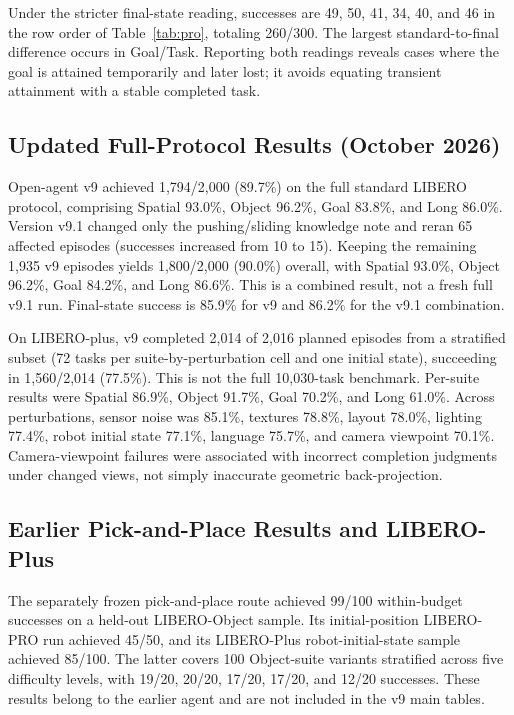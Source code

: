 Under the stricter final-state reading, successes are 49, 50, 41, 34, 40, and 46 in the row order of Table~\ref{tab:pro}, totaling 260/300. The largest standard-to-final difference occurs in Goal/Task. Reporting both readings reveals cases where the goal is attained temporarily and later lost; it avoids equating transient attainment with a stable completed task.

\subsection{Updated Full-Protocol Results (October 2026)}

Open-agent v9 achieved 1,794/2,000 (89.7\%) on the full standard LIBERO protocol, comprising Spatial 93.0\%, Object 96.2\%, Goal 83.8\%, and Long 86.0\%. Version v9.1 changed only the pushing/sliding knowledge note and reran 65 affected episodes (successes increased from 10 to 15). Keeping the remaining 1,935 v9 episodes yields 1,800/2,000 (90.0\%) overall, with Spatial 93.0\%, Object 96.2\%, Goal 84.2\%, and Long 86.6\%. This is a combined result, not a fresh full v9.1 run. Final-state success is 85.9\% for v9 and 86.2\% for the v9.1 combination.

On LIBERO-plus, v9 completed 2,014 of 2,016 planned episodes from a stratified subset (72 tasks per suite-by-perturbation cell and one initial state), succeeding in 1,560/2,014 (77.5\%). This is not the full 10,030-task benchmark. Per-suite results were Spatial 86.9\%, Object 91.7\%, Goal 70.2\%, and Long 61.0\%. Across perturbations, sensor noise was 85.1\%, textures 78.8\%, layout 78.0\%, lighting 77.4\%, robot initial state 77.1\%, language 75.7\%, and camera viewpoint 70.1\%. Camera-viewpoint failures were associated with incorrect completion judgments under changed views, not simply inaccurate geometric back-projection.

\subsection{Earlier Pick-and-Place Results and LIBERO-Plus}
The separately frozen pick-and-place route achieved 99/100 within-budget successes on a held-out LIBERO-Object sample. Its initial-position LIBERO-PRO run achieved 45/50, and its LIBERO-Plus robot-initial-state sample achieved 85/100. The latter covers 100 Object-suite variants stratified across five difficulty levels, with 19/20, 20/20, 17/20, 17/20, and 12/20 successes. These results belong to the earlier agent and are not included in the v9 main tables.

